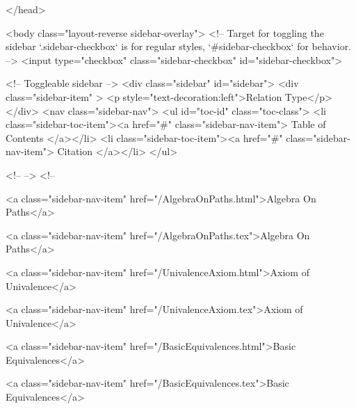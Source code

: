   
</head>




  <body class="layout-reverse sidebar-overlay">
    <!-- Target for toggling the sidebar `.sidebar-checkbox` is for regular
     styles, `#sidebar-checkbox` for behavior. -->
<input type="checkbox" class="sidebar-checkbox" id="sidebar-checkbox">

<!-- Toggleable sidebar -->
<div class="sidebar" id="sidebar">
  <div class="sidebar-item" >
    <p style="text-decoration:left">Relation Type</p>
  </div>
  <nav class="sidebar-nav">
    <ul id="toc-id" class="toc-class">
  <li class="sidebar-toc-item"><a href="#" class="sidebar-nav-item"> Table of Contents </a></li>
  <li class="sidebar-toc-item"><a href="#" class="sidebar-nav-item"> Citation </a></li>
</ul>


    <!--  -->
    <!-- 
      
    
      
    
      
    
      
    
      
        
      
    
      
        
          <a class="sidebar-nav-item" href="/AlgebraOnPaths.html">Algebra On Paths</a>
        
      
    
      
        
          <a class="sidebar-nav-item" href="/AlgebraOnPaths.tex">Algebra On Paths</a>
        
      
    
      
        
          <a class="sidebar-nav-item" href="/UnivalenceAxiom.html">Axiom of Univalence</a>
        
      
    
      
        
          <a class="sidebar-nav-item" href="/UnivalenceAxiom.tex">Axiom of Univalence</a>
        
      
    
      
        
          <a class="sidebar-nav-item" href="/BasicEquivalences.html">Basic Equivalences</a>
        
      
    
      
        
          <a class="sidebar-nav-item" href="/BasicEquivalences.tex">Basic Equivalences</a>
        

